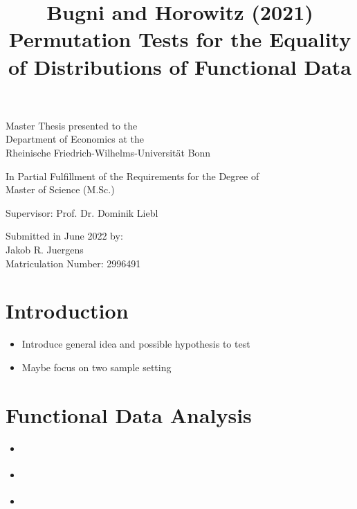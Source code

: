 \documentclass[11pt,twoside,a4paper]{article}
\theoremstyle{assumpstyle} \newtheorem{assumption}{Assumption}
\theoremstyle{assumpstyle} \newtheorem{definition}{Definition}
\begin{document}
	
	\title{{\huge Bugni and Horowitz (2021) Permutation Tests for the Equality of Distributions of Functional Data}}
	\date{}
	\maketitle
	\thispagestyle{empty}
	\vspace{1.5 cm}
	\begin{center}
		
		\Large
		Master Thesis presented to the\\
		Department of Economics at the\\
		Rheinische Friedrich-Wilhelms-Universität Bonn
		\vspace{1.5cm}

		\large
		In Partial Fulfillment of the Requirements for the Degree of\\
		Master of Science (M.Sc.)
		
		\vspace{3cm}
		
		Supervisor: Prof. Dr. Dominik Liebl
		
		\vspace{3cm}
		
		Submitted in June 2022 by: \\
		Jakob R. Juergens\\
		Matriculation Number: 2996491
	\end{center}
	
	\newpage
	
	\thispagestyle{empty}
	\tableofcontents
	
	\newpage
	
	\section{Introduction}
		\begin{itemize}
			\item Introduce general idea and possible hypothesis to test
			\item Maybe focus on two sample setting
		\end{itemize}
	
	\section{Functional Data Analysis}
		\begin{itemize}
			\item \cite{ramsay_functional_2005}
			\item \cite{kokoszka_introduction_2021}
			\item \cite{hsing_theoretical_2015}
		\end{itemize}
	
\end{document}
